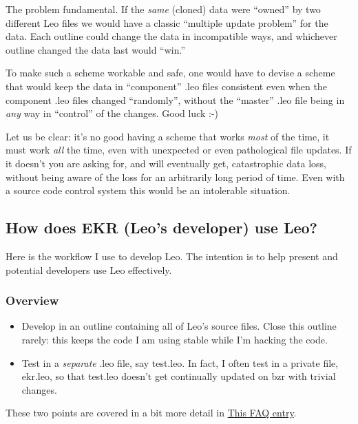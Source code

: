 \documentclass[a4paper,10pt,english]{sphinxmanual}
\begin{document}
The problem fundamental. If the \emph{same} (cloned) data were ``owned'' by two
different Leo files we would have a classic ``multiple update problem'' for the
data. Each outline could change the data in incompatible ways, and whichever
outline changed the data last would ``win.''

To make such a scheme workable and safe, one would have to devise a scheme that
would keep the data in ``component'' .leo files consistent even when the component
.leo files changed ``randomly'', without the ``master'' .leo file being in \emph{any} way
in ``control'' of the changes. Good luck :-)

Let us be clear: it's no good having a scheme that works \emph{most} of the time, it
must work \emph{all} the time, even with unexpected or even pathological file
updates. If it doesn't you are asking for, and will eventually get, catastrophic
data loss, without being aware of the loss for an arbitrarily long period of
time. Even with a source code control system this would be an intolerable
situation.


\subsection{How does EKR (Leo's developer) use Leo?}
\label{FAQ:how-does-ekr-leo-s-developer-use-leo}
Here is the workflow I use to develop Leo. The intention is to help
present and potential developers use Leo effectively.


\subsubsection{Overview}
\label{FAQ:overview}\begin{itemize}
\item {} 
Develop in an outline containing all of Leo's source files. Close this outline
rarely: this keeps the code I am using stable while I'm hacking the code.

\item {} 
Test in a \emph{separate} .leo file, say test.leo. In fact, I often test in a
private file, ekr.leo, so that test.leo doesn't get continually updated on bzr
with trivial changes.

\end{itemize}

These two points are covered in a bit more detail in \href{http://webpages.charter.net/edreamleo/FAQ.html\#how-can-i-use-leo-to-develop-leo-itself}{This FAQ entry}.
\end{document}
